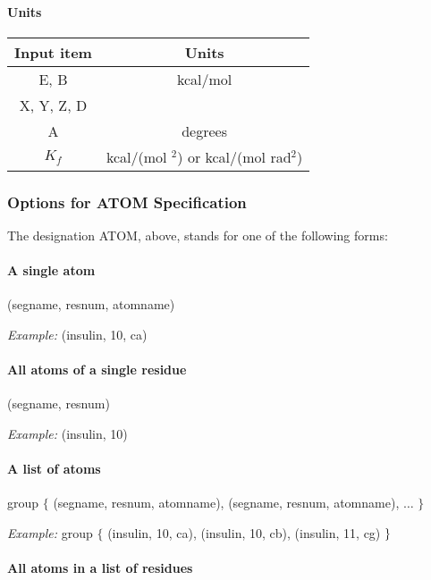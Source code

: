\paragraph*{Units}

\qquad \qquad 
\begin{tabular}{|c|c|}
\hline
Input item & Units \\ \hline
E, B & kcal/mol \\ 
X, Y, Z, D & %
\\ 
A & degrees \\ 
$K_{f}$ & kcal/(mol %
$^{2}$) or kcal/(mol rad$^{2}$) \\ \hline
\end{tabular}

\pagebreak

\subsubsection{Options for ATOM Specification}

The designation ATOM, above, stands for one of the following forms:\medskip

\paragraph*{A single atom}

(segname, resnum, atomname)

{\em Example:} (insulin, 10, ca)\medskip 

\paragraph*{All atoms of a single residue}

(segname, resnum)

{\em Example:} (insulin, 10)\medskip 

\paragraph*{A list of atoms}

group $\{$ (segname, resnum, atomname), (segname, resnum, atomname), $\ldots 
$ $\}$

{\em Example:} group $\{$ (insulin, 10, ca), (insulin, 10, cb), (insulin,
11, cg) $\}\medskip $

\paragraph*{All atoms in a list of residues}

